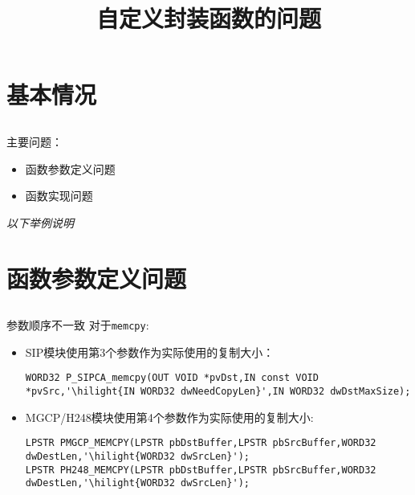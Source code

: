 ﻿\documentclass[hyperref={bookmarks=ture}xcolor=pdflatex,svgnames,table,compress]{beamer}
\title{自定义封装函数的问题}
\author{}
\date{}
\begin{document}
\begin{frame}
\titlepage
\end{frame}

\section{基本情况}
\subsection{}
\begin{frame}
主要问题：
\begin{itemize}
    \item 函数参数定义问题
    \item 函数实现问题
\end{itemize}

\textit{以下举例说明}
\end{frame}

\section{函数参数定义问题}
\subsection{}
\begin{frame}[containsverbatim]{参数顺序不一致}
对于\lstinline{memcpy}:

\begin{itemize}
    \item SIP模块使用第{\color{red}3}个参数作为实际使用的复制大小：
\begin{lstlisting}[basicstyle=\ttfamily\scriptsize]
WORD32 P_SIPCA_memcpy(OUT VOID *pvDst,IN const VOID *pvSrc,'\hilight{IN WORD32 dwNeedCopyLen}',IN WORD32 dwDstMaxSize);
\end{lstlisting}
    \item MGCP/H248模块使用第{\color{red}4}个参数作为实际使用的复制大小:
\begin{lstlisting}[basicstyle=\ttfamily\scriptsize]
LPSTR PMGCP_MEMCPY(LPSTR pbDstBuffer,LPSTR pbSrcBuffer,WORD32 dwDestLen,'\hilight{WORD32 dwSrcLen}');
LPSTR PH248_MEMCPY(LPSTR pbDstBuffer,LPSTR pbSrcBuffer,WORD32 dwDestLen,'\hilight{WORD32 dwSrcLen}');
\end{lstlisting}
\end{itemize}
\end{frame}
\end{document}
